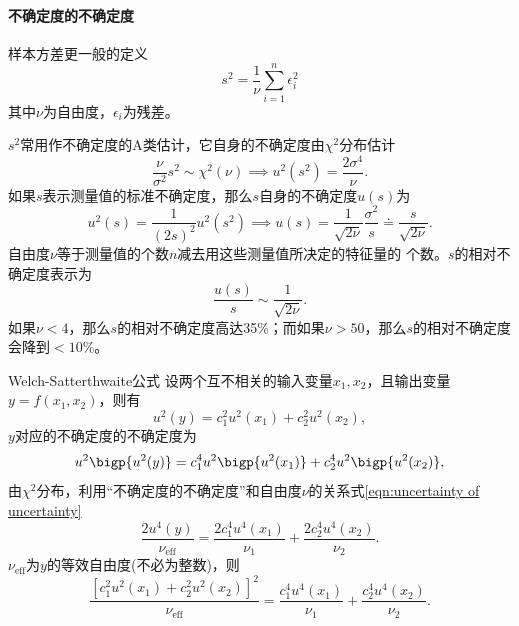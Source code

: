 \paragraph{不确定度的不确定度}
样本方差更一般的定义
\[
	s^2=\frac1\nu\sum_{i=1}^n\epsilon_i^2
\]
其中$\nu$为自由度，$\epsilon_i$为残差。

$s^2$常用作不确定度的A类估计，它自身的不确定度由$\chi^2$分布估计
\begin{equation}
	\label{eqn:uncertainty of uncertainty}
	\frac\nu{\sigma^2}s^2\sim\chi^2(\nu)\implies u^2(s^2)=\frac{2\sigma^4}\nu.\tag{$\ast$}
\end{equation}
如果$ s $表示测量值的标准不确定度，那么$ s $自身的不确定度$ u(s) $为
\[
	u^2(s)=\frac1{(2s)^2}u^2(s^2)\implies u(s)=\frac1{\sqrt{2\nu}}\frac{\sigma^2}s\doteq\frac s{\sqrt{2\nu}}.
\]
自由度$\nu$等于测量值的个数$ n $减去用这些测量值所决定的特征量的
个数。$s $的相对不确定度表示为
\[
	\frac{u(s)}s\sim\frac1{\sqrt{2\nu}}.
\]
如果$\nu<4$，那么$ s $的相对不确定度高达35\%；而如果$\nu>50$，那么$ s $的相对不确定度会降到$<10\%$。
\begin{theorem}{Welch-Satterthwaite公式}{}
	设两个互不相关的输入变量$x_1,x_2$，且输出变量$y=f(x_1,x_2)$，则有
	\[
		u^2(y)=c_1^2u^2(x_1)+c_2^2u^2(x_2),
	\]
	$y $对应的不确定度的不确定度为
	\[
		u^2\bigp{u^2(y)}=c_1^4u^2\bigp{u^2(x_1)}+c_2^4u^2\bigp{u^2(x_2)},
	\]
	由$\chi^2$分布，利用“不确定度的不确定度”和自由度$\nu$的关系式\eqref{eqn:uncertainty of uncertainty}
	\[
		\frac{2u^4(y)}{\nu_{\mathrm{eff}}}=\frac{2c_1^4u^4(x_1)}{\nu_1}+\frac{2c_2^4u^4(x_2)}{\nu_2}.
	\]
	$\nu_{\mathrm{eff}}$为$ y $的等效自由度(不必为整数)，则
	\[
		\frac{[c_1^2u^2(x_1)+c_2^2u^2(x_2)]^2}{\nu_{\mathrm{eff}}}=\frac{c_1^4u^4(x_1)}{\nu_1}+\frac{c_2^4u^4(x_2)}{\nu_2}.
	\]
\end{theorem}
